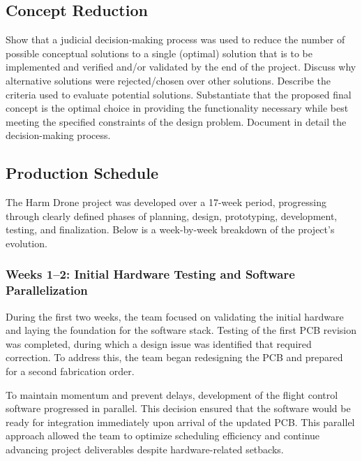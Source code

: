 \documentclass[12pt]{article}
\begin{document}
\subsection{Concept Reduction}
Show that a judicial decision-making process was used to reduce the number of possible conceptual solutions to a single (optimal) solution that is to be implemented and verified and/or validated by the end of the project. Discuss why alternative solutions were rejected/chosen over other solutions. Describe the criteria used to evaluate potential solutions. Substantiate that the proposed final concept is the optimal choice in providing the functionality necessary while best meeting the specified constraints of the design problem. Document in detail the decision-making process.

\subsection{Production Schedule}

The Harm Drone project was developed over a 17-week period, progressing through clearly defined phases of planning, design, prototyping, development, testing, and finalization. Below is a week-by-week breakdown of the project's evolution.

\subsubsection*{Weeks 1–2: Initial Hardware Testing and Software Parallelization}

During the first two weeks, the team focused on validating the initial hardware and laying the foundation for the software stack. Testing of the first PCB revision was completed, during which a design issue was identified that required correction. To address this, the team began redesigning the PCB and prepared for a second fabrication order.

To maintain momentum and prevent delays, development of the flight control software progressed in parallel. This decision ensured that the software would be ready for integration immediately upon arrival of the updated PCB. This parallel approach allowed the team to optimize scheduling efficiency and continue advancing project deliverables despite hardware-related setbacks.
\end{document}
